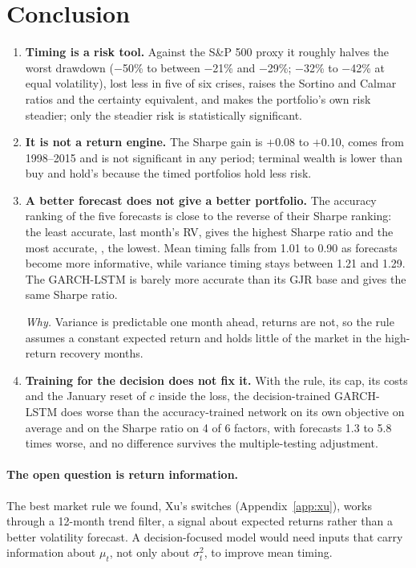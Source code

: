 \section{Conclusion}
\begin{enumerate}
\item \textbf{Timing is a risk tool.} Against the S\&P 500 proxy it roughly halves the worst drawdown ($-$50\% to between $-$21\% and $-$29\%; $-$32\% to $-$42\% at equal volatility), lost less in five of six crises, raises the Sortino and Calmar ratios and the certainty equivalent, and makes the portfolio's own risk steadier; only the steadier risk is statistically significant.
\item \textbf{It is not a return engine.} The Sharpe gain is $+$0.08 to $+$0.10, comes from 1998--2015 and is not significant in any period; terminal wealth is lower than buy and hold's because the timed portfolios hold less risk.
\item \textbf{A better forecast does not give a better portfolio.} The accuracy ranking of the five forecasts is close to the reverse of their Sharpe ranking: the least accurate, last month's RV, gives the highest Sharpe ratio and the most accurate, \VIX, the lowest. Mean timing falls from 1.01 to 0.90 as forecasts become more informative, while variance timing stays between 1.21 and 1.29. The GARCH-LSTM is barely more accurate than its GJR base and gives the same Sharpe ratio.

\textit{Why.} Variance is predictable one month ahead, returns are not, so the rule assumes a constant expected return and holds little of the market in the high-return recovery months.
\item \textbf{Training for the decision does not fix it.} With the rule, its cap, its costs and the January reset of $c$ inside the loss, the decision-trained GARCH-LSTM does worse than the accuracy-trained network on its own objective on average and on the Sharpe ratio on 4 of 6 factors, with forecasts 1.3 to 5.8 times worse, and no difference survives the multiple-testing adjustment.
\end{enumerate}
\paragraph{The open question is return information.} The best market rule we found, Xu's switches (Appendix~\ref{app:xu}), works through a 12-month trend filter, a signal about expected returns rather than a better volatility forecast. A decision-focused model would need inputs that carry information about $\mu_t$, not only about $\sigma_t^2$, to improve mean timing.

